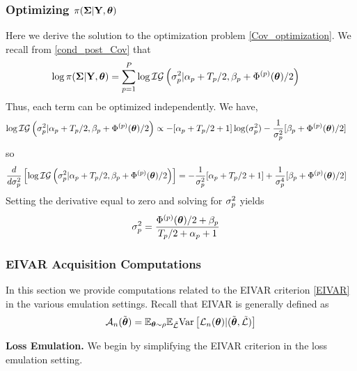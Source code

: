 \documentclass[12pt]{article}
\begin{document}
\subsubsection{Optimizing $\pi(\boldsymbol{\Sigma}|\mathbf{Y}, \boldsymbol{\theta})$}
Here we derive the solution to the optimization problem \ref{Cov_optimization}. We recall from \ref{cond_post_Cov} that 
\begin{align*}
\log \pi(\boldsymbol{\Sigma}|\mathbf{Y}, \boldsymbol{\theta}) &= \sum_{p = 1}^{P} \log \mathcal{IG}\left(\sigma_{p}^2|\alpha_{p} + T_{p}/2, \beta_{p} + \Phi^{(p)}(\boldsymbol{\theta})/2 \right)
\end{align*}
Thus, each term can be optimized independently. We have, 
\begin{align*}
\log \mathcal{IG}\left(\sigma_{p}^2|\alpha_{p} + T_{p}/2, \beta_{p} + \Phi^{(p)}(\boldsymbol{\theta})/2 \right) &\propto -[\alpha_{p} + T_{p}/2 + 1]\log(\sigma^2_{p})
																									       - \frac{1}{\sigma^2_{p}} [\beta_{p} + \Phi^{(p)}(\boldsymbol{\theta})/2]
\end{align*}
so 
\begin{align*}
\frac{d}{d\sigma_{p}^2}\left[\log \mathcal{IG}\left(\sigma_{p}^2|\alpha_{p} + T_{p}/2, \beta_{p} + \Phi^{(p)}(\boldsymbol{\theta})/2 \right)\right] &= -\frac{1}{\sigma_{p}^2}[\alpha_{p} + T_{p}/2 + 1] + \frac{1}{\sigma_{p}^4} [\beta_{p} + \Phi^{(p)}(\boldsymbol{\theta})/2]
\end{align*}
Setting the derivative equal to zero and solving for $\sigma^2_{p}$ yields
\begin{align*}
\sigma_{p}^2 &= \frac{\Phi^{(p)}(\boldsymbol{\theta})/2 + \beta_{p}}{T_{p}/2 + \alpha_{p} + 1}
\end{align*}


\subsubsection{EIVAR Acquisition Computations}
In this section we provide computations related to the EIVAR criterion \ref{EIVAR} in the various emulation settings. Recall that EIVAR is generally defined as 
\begin{align*}
\mathcal{A}_{n}(\tilde{\boldsymbol{\theta}}) = \mathbb{E}_{\boldsymbol{\theta} \sim \rho} \mathbb{E}_{\tilde{\mathcal{L}}} \mathrm{Var}\left[\mathcal{L}_{n}(\boldsymbol{\theta}) | (\tilde{\boldsymbol{\theta}}, \tilde{\mathcal{L}}) \right] 
\end{align*}

\noindent
\textbf{Loss Emulation.} 
We begin by simplifying the EIVAR criterion  in the loss emulation setting. 
\end{document}
